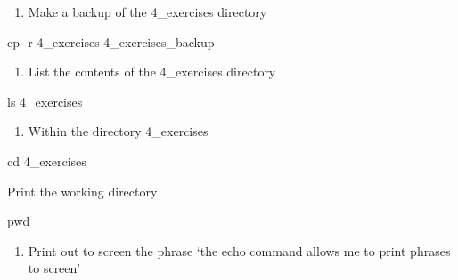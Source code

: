 \documentclass[
  letterpaper,
  DIV=11,
  numbers=noendperiod]{scrreprt}
\newenvironment{Shaded}{\begin{snugshade}}{\end{snugshade}}
\newcommand{\AttributeTok}[1]{\textcolor[rgb]{0.40,0.45,0.13}{#1}}
\newcommand{\BuiltInTok}[1]{\textcolor[rgb]{0.00,0.23,0.31}{#1}}
\newcommand{\FunctionTok}[1]{\textcolor[rgb]{0.28,0.35,0.67}{#1}}
\newcommand{\NormalTok}[1]{\textcolor[rgb]{0.00,0.23,0.31}{#1}}
\providecommand{\tightlist}{%
  \setlength{\itemsep}{0pt}\setlength{\parskip}{0pt}}\usepackage{longtable,booktabs,array}
\begin{document}
\begin{enumerate}
\def\labelenumi{\arabic{enumi}.}
\setcounter{enumi}{1}
\tightlist
\item
  Make a backup of the 4\_exercises directory
\end{enumerate}

\begin{Shaded}
\begin{Highlighting}[]
\FunctionTok{cp} \AttributeTok{{-}r}\NormalTok{ 4\_exercises 4\_exercises\_backup }
\end{Highlighting}
\end{Shaded}

\begin{enumerate}
\def\labelenumi{\arabic{enumi}.}
\setcounter{enumi}{2}
\tightlist
\item
  List the contents of the 4\_exercises directory
\end{enumerate}

\begin{Shaded}
\begin{Highlighting}[]
\FunctionTok{ls}\NormalTok{ 4\_exercises}
\end{Highlighting}
\end{Shaded}

\begin{enumerate}
\def\labelenumi{\arabic{enumi}.}
\setcounter{enumi}{3}
\tightlist
\item
  Within the directory 4\_exercises
\end{enumerate}

\begin{Shaded}
\begin{Highlighting}[]
\BuiltInTok{cd}\NormalTok{ 4\_exercises}
\end{Highlighting}
\end{Shaded}

Print the working directory

\begin{Shaded}
\begin{Highlighting}[]
\BuiltInTok{pwd}
\end{Highlighting}
\end{Shaded}

\begin{enumerate}
\def\labelenumi{\alph{enumi}.}
\setcounter{enumi}{1}
\tightlist
\item
  Print out to screen the phrase `the echo command allows me to print
  phrases to screen'
\end{enumerate}
\end{document}
